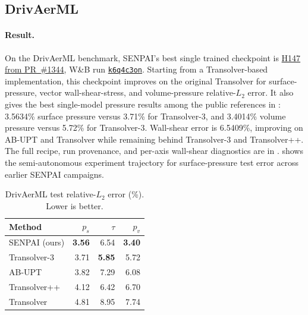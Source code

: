 \documentclass{article}
\newcommand{\best}[1]{\textbf{#1}}
\begin{document}
\subsection{DrivAerML}

\paragraph{Result.}
On the DrivAerML benchmark, SENPAI's best single trained checkpoint is \href{https://github.com/morganmcg1/DrivAerML/pull/1344}{H147 from PR~\#1344}, W\&B run \href{https://wandb.ai/wandb-applied-ai-team/senpai-v1-drivaerml-ddp8/runs/k6q4c3on}{\texttt{k6q4c3on}}. Starting from a Transolver-based implementation, this checkpoint improves on the original Transolver for surface-pressure, vector wall-shear-stress, and volume-pressure relative-$L_2$ error. It also gives the best single-model pressure results among the public references in : 3.5634\% surface pressure versus 3.71\% for Transolver-3, and 3.4014\% volume pressure versus 5.72\% for Transolver-3. Wall-shear error is 6.5409\%, improving on AB-UPT and Transolver while remaining behind Transolver-3 and Transolver++. The full recipe, run provenance, and per-axis wall-shear diagnostics are in .  shows the semi-autonomous experiment trajectory for surface-pressure test error across earlier SENPAI campaigns.

\begin{table}[t]
  \caption{DrivAerML test relative-$L_2$ error (\%). Lower is better.}
  \label{tab:drivaerml}
  \centering
  \small
  \setlength{\tabcolsep}{3pt}
  \begin{tabular}{@{}lrrr@{}}
    \toprule
    Method & $p_s$ & $\tau$ & $p_v$ \\
    \midrule
    SENPAI (ours) & \best{3.56} & 6.54 & \best{3.40} \\
    Transolver-3 \citep{zhou2026transolver3} & 3.71 & \best{5.85} & 5.72 \\
    AB-UPT \citep{alkin2025abupt} & 3.82 & 7.29 & 6.08 \\
    Transolver++ \citep{luo2025transolverplusplus} & 4.12 & 6.42 & 6.70 \\
    Transolver \citep{wu2024transolver} & 4.81 & 8.95 & 7.74 \\
    \bottomrule
  \end{tabular}
\end{table}
\end{document}
